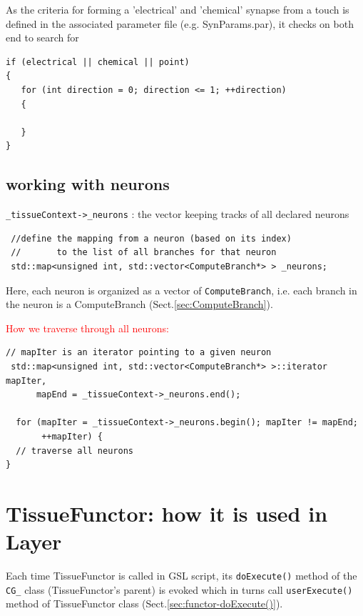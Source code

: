 As the criteria for forming a 'electrical' and 'chemical' synapse from a touch
is defined in the associated parameter file (e.g. SynParams.par), it checks on
both end to search for 
\begin{lstlisting}
if (electrical || chemical || point)
{
   for (int direction = 0; direction <= 1; ++direction)
   {

   }
}
\end{lstlisting}


\subsection{working with neurons}
\label{sec:NTS-working-with-neurons}

\verb!_tissueContext->_neurons! : the vector keeping tracks of all
  declared neurons

\begin{lstlisting}
 //define the mapping from a neuron (based on its index)
 //       to the list of all branches for that neuron 
 std::map<unsigned int, std::vector<ComputeBranch*> > _neurons;
\end{lstlisting}
Here, each neuron is organized as a vector of \verb!ComputeBranch!, i.e. each
branch in the neuron is a ComputeBranch (Sect.\ref{sec:ComputeBranch}).

\textcolor{red}{How we traverse through all neurons:}

{\tiny
\begin{verbatim}
// mapIter is an iterator pointing to a given neuron
 std::map<unsigned int, std::vector<ComputeBranch*> >::iterator mapIter,
      mapEnd = _tissueContext->_neurons.end();
      
  for (mapIter = _tissueContext->_neurons.begin(); mapIter != mapEnd;
       ++mapIter) {
  // traverse all neurons
}
\end{verbatim}
}

\section{TissueFunctor: how it is used in Layer}

Each time TissueFunctor is called in GSL script, its \verb!doExecute()! method
of the \verb!CG_! class (TissueFunctor's parent) is evoked which in turns call
\verb!userExecute()! method of TissueFunctor class
(Sect.\ref{sec:functor-doExecute()}).

